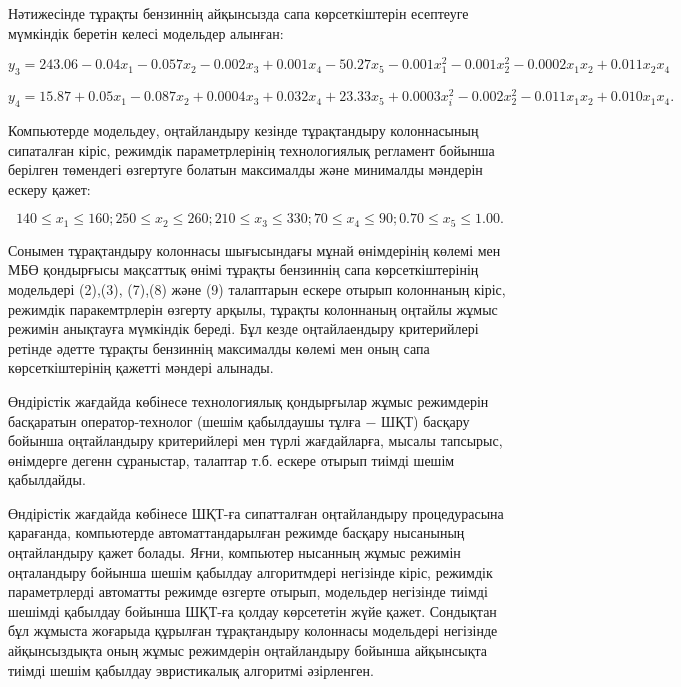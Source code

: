 Нәтижесінде тұрақты бензиннің айқынсызда сапа көрсеткіштерін есептеуге
мүмкіндік беретін келесі модельдер алынған:

\begin{equation}
y_3=243.06-0.04x_1-0.057x_2-0.002x_3+0.001x_4-50.27x_5-0.001x_1^2-0.001x_2^2-0.0002x_1x_2+0.011x_2x_4
\end{equation}

\begin{equation}
y_4=15.87+0.05x_1-0.087x_2+0.0004x_3+0.032x_4+23.33x_5+0.0003x_i^2-0.002x_2^2-0.011x_1x_2+0.010x_1x_4.
\end{equation}

Компьютерде модельдеу, оңтайландыру кезінде тұрақтандыру колоннасының
сипаталған кіріс, режимдік параметрлерінің технологиялық регламент
бойынша берілген төмендегі өзгертуге болатын максималды және минималды
мәндерін ескеру қажет:

\begin{equation}
140\leq x_1 \leq 160;250\leq x_2\leq 260;210\leq x_3\leq 330;70\leq x_4\leq 90;0.70\leq x_5\leq 1.00.
\end{equation}

Сонымен тұрақтандыру колоннасы шығысындағы мұнай өнімдерінің көлемі мен
МБӨ қондырғысы мақсаттық өнімі тұрақты бензиннің сапа көрсеткіштерінің
модельдері (2),(3), (7),(8) және (9) талаптарын ескере отырып колоннаның
кіріс, режимдік паракемтрлерін өзгерту арқылы, тұрақты колоннаның
оңтайлы жұмыс режимін анықтауға мүмкіндік береді. Бұл кезде
оңтайлаендыру критерийлері ретінде әдетте тұрақты бензиннің максималды
көлемі мен оның сапа көрсеткіштерінің қажетті мәндері алынады.

Өндірістік жағдайда көбінесе технологиялық қондырғылар жұмыс режимдерін
басқаратын оператор-технолог (шешім қабылдаушы тұлға − ШҚТ) басқару
бойынша оңтайландыру критерийлері мен түрлі жағдайларға, мысалы
тапсырыс, өнімдерге дегенн сұраныстар, талаптар т.б. ескере отырып
тиімді шешім қабылдайды.

Өндірістік жағдайда көбінесе ШҚТ-ға сипатталған оңтайландыру
процедурасына қарағанда, компьютерде автоматтандарылған режимде басқару
нысанының оңтайландыру қажет болады. Яғни, компьютер нысанның жұмыс
режимін оңталандыру бойынша шешім қабылдау алгоритмдері негізінде кіріс,
режимдік параметрлерді автоматты режимде өзгерте отырып, модельдер
негізінде тиімді шешімді қабылдау бойынша ШҚТ-ға қолдау көрсететін жүйе
қажет. Сондықтан бұл жұмыста жоғарыда құрылған тұрақтандыру колоннасы
модельдері негізінде айқынсыздықта оның жұмыс режимдерін оңтайландыру
бойынша айқынсықта тиімді шешім қабылдау эвристикалық алгоритмі
әзірленген.

